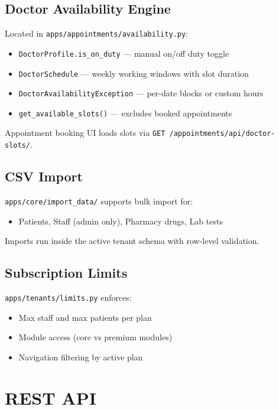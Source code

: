 \documentclass[11pt,a4paper]{report}
\begin{document}
\section{Doctor Availability Engine}

Located in \texttt{apps/appointments/availability.py}:
\begin{itemize}[noitemsep]
    \item \texttt{DoctorProfile.is\_on\_duty} --- manual on/off duty toggle
    \item \texttt{DoctorSchedule} --- weekly working windows with slot duration
    \item \texttt{DoctorAvailabilityException} --- per-date blocks or custom hours
    \item \texttt{get\_available\_slots()} --- excludes booked appointments
\end{itemize}

Appointment booking UI loads slots via \texttt{GET /appointments/api/doctor-slots/}.

\section{CSV Import}

\texttt{apps/core/import\_data/} supports bulk import for:
\begin{itemize}[noitemsep]
    \item Patients, Staff (admin only), Pharmacy drugs, Lab tests
\end{itemize}

Imports run inside the active tenant schema with row-level validation.

\section{Subscription Limits}

\texttt{apps/tenants/limits.py} enforces:
\begin{itemize}[noitemsep]
    \item Max staff and max patients per plan
    \item Module access (core vs premium modules)
    \item Navigation filtering by active plan
\end{itemize}

\chapter{REST API}
\end{document}

